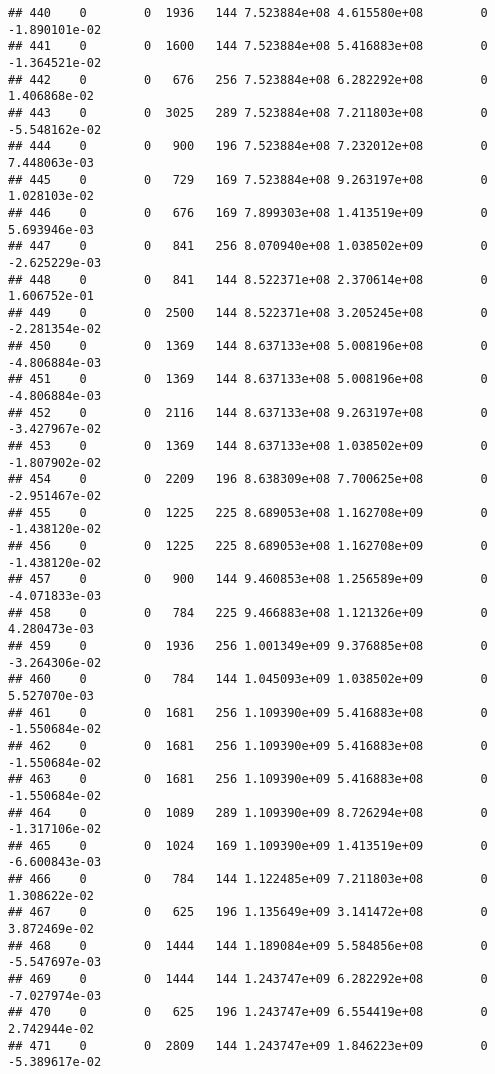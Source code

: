 \documentclass[
]{article}
\begin{document}
\begin{enumerate}
\begin{verbatim}
## 440    0        0  1936   144 7.523884e+08 4.615580e+08        0 -1.890101e-02
## 441    0        0  1600   144 7.523884e+08 5.416883e+08        0 -1.364521e-02
## 442    0        0   676   256 7.523884e+08 6.282292e+08        0  1.406868e-02
## 443    0        0  3025   289 7.523884e+08 7.211803e+08        0 -5.548162e-02
## 444    0        0   900   196 7.523884e+08 7.232012e+08        0  7.448063e-03
## 445    0        0   729   169 7.523884e+08 9.263197e+08        0  1.028103e-02
## 446    0        0   676   169 7.899303e+08 1.413519e+09        0  5.693946e-03
## 447    0        0   841   256 8.070940e+08 1.038502e+09        0 -2.625229e-03
## 448    0        0   841   144 8.522371e+08 2.370614e+08        0  1.606752e-01
## 449    0        0  2500   144 8.522371e+08 3.205245e+08        0 -2.281354e-02
## 450    0        0  1369   144 8.637133e+08 5.008196e+08        0 -4.806884e-03
## 451    0        0  1369   144 8.637133e+08 5.008196e+08        0 -4.806884e-03
## 452    0        0  2116   144 8.637133e+08 9.263197e+08        0 -3.427967e-02
## 453    0        0  1369   144 8.637133e+08 1.038502e+09        0 -1.807902e-02
## 454    0        0  2209   196 8.638309e+08 7.700625e+08        0 -2.951467e-02
## 455    0        0  1225   225 8.689053e+08 1.162708e+09        0 -1.438120e-02
## 456    0        0  1225   225 8.689053e+08 1.162708e+09        0 -1.438120e-02
## 457    0        0   900   144 9.460853e+08 1.256589e+09        0 -4.071833e-03
## 458    0        0   784   225 9.466883e+08 1.121326e+09        0  4.280473e-03
## 459    0        0  1936   256 1.001349e+09 9.376885e+08        0 -3.264306e-02
## 460    0        0   784   144 1.045093e+09 1.038502e+09        0  5.527070e-03
## 461    0        0  1681   256 1.109390e+09 5.416883e+08        0 -1.550684e-02
## 462    0        0  1681   256 1.109390e+09 5.416883e+08        0 -1.550684e-02
## 463    0        0  1681   256 1.109390e+09 5.416883e+08        0 -1.550684e-02
## 464    0        0  1089   289 1.109390e+09 8.726294e+08        0 -1.317106e-02
## 465    0        0  1024   169 1.109390e+09 1.413519e+09        0 -6.600843e-03
## 466    0        0   784   144 1.122485e+09 7.211803e+08        0  1.308622e-02
## 467    0        0   625   196 1.135649e+09 3.141472e+08        0  3.872469e-02
## 468    0        0  1444   144 1.189084e+09 5.584856e+08        0 -5.547697e-03
## 469    0        0  1444   144 1.243747e+09 6.282292e+08        0 -7.027974e-03
## 470    0        0   625   196 1.243747e+09 6.554419e+08        0  2.742944e-02
## 471    0        0  2809   144 1.243747e+09 1.846223e+09        0 -5.389617e-02

\end{verbatim}
\end{enumerate}
\end{document}
